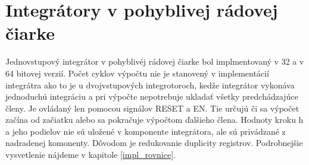 

\section{Integrátory v pohyblivej rádovej čiarke}
Jednovstupový integrátor v pohyblivéj rádovej čiarke bol implmentovaný v 32 a v 64 bitovej verzií. Počet cyklov výpočtu nie je stanovený v implementácií integrátra ako to je u dvojvstupových integrotoroch, kedže integrátor vykonáva jednoduchú integráciu a pri výpočte nepotrebuje ukladať všetky predchádzajúce členy. Je ovládaný len pomocou signálov RESET a EN. Tie určujú či sa výpočet začína od začiatku alebo sa pokračuje výpočtom ďalšieho člena. Hodnoty kroku h a jeho podielov nie sú uložené v komponente integrátora, ale sú privádzané z nadradenej komonenty. Dôvodom je redukovanie duplicity registrov. Podrobnejšie vysvetlenie nájdeme v kapitole \ref{impl_rovnice}.

